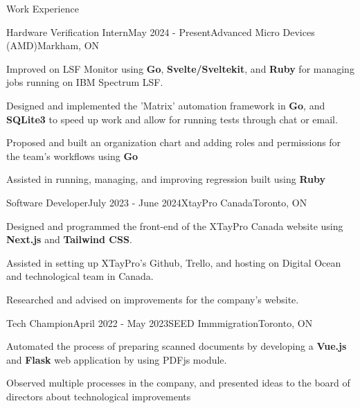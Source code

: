 \documentclass[
	11pt, %
]{resume} %
\begin{document}
\begin{rSection}{Work Experience}

	\begin{rSubsection}{Hardware Verification Intern}{May 2024 - Present}{Advanced Micro Devices (AMD)}{Markham, ON}
	\item Improved on LSF Monitor using \textbf{Go}, \textbf{Svelte/Sveltekit}, and \textbf{Ruby} for managing jobs running on IBM Spectrum LSF.
	\item Designed and implemented the 'Matrix' automation framework in \textbf{Go}, and \textbf{SQLite3} to speed up work and allow for running tests through chat or email.
	\item Proposed and built an organization chart and adding roles and permissions for the team's workflows using \textbf{Go}
	\item Assisted in running, managing, and improving regression built using \textbf{Ruby}
	\end{rSubsection}


	\begin{rSubsection}{Software Developer}{July 2023 - June 2024}{XtayPro Canada}{Toronto, ON}
		\item Designed and programmed the front-end of the XTayPro Canada website using \textbf{Next.js} and \textbf{Tailwind CSS}.
		\item Assisted in setting up XTayPro's Github, Trello, and hosting on Digital Ocean and technological team in Canada.
		\item Researched and advised on improvements for the company's website.
	\end{rSubsection}


	\begin{rSubsection}{Tech Champion}{April 2022 - May 2023}{SEED Immmigration}{Toronto, ON}
		\item Automated the process of preparing scanned documents by developing a \textbf{Vue.js} and \textbf{Flask} web application by using PDFjs module.
		\item Observed multiple processes in the company, and presented ideas to the board of directors about technological improvements
	\end{rSubsection}



\end{rSection}
\end{document}
